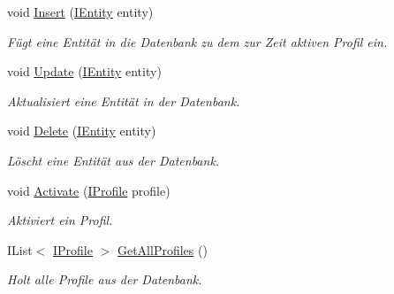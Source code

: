 \begin{CompactItemize}
\item 
void \hyperlink{interfacemy_m_d_1_1_model_1_1_database_model_1_1_i_entity_database_71b401e7c809fdda0a0b15b6792e69c8}{Insert} (\hyperlink{interfacemy_m_d_1_1_model_interface_1_1_data_model_interface_1_1_i_entity}{IEntity} entity)
\begin{CompactList}\small\item\em F\"{u}gt eine Entit\"{a}t in die Datenbank zu dem zur Zeit aktiven Profil ein. \item\end{CompactList}\item 
void \hyperlink{interfacemy_m_d_1_1_model_1_1_database_model_1_1_i_entity_database_bf510dc6cf79d153f564eca0f10971d2}{Update} (\hyperlink{interfacemy_m_d_1_1_model_interface_1_1_data_model_interface_1_1_i_entity}{IEntity} entity)
\begin{CompactList}\small\item\em Aktualisiert eine Entit\"{a}t in der Datenbank. \item\end{CompactList}\item 
void \hyperlink{interfacemy_m_d_1_1_model_1_1_database_model_1_1_i_entity_database_1ec3022b27f9091440cb495f510d25b0}{Delete} (\hyperlink{interfacemy_m_d_1_1_model_interface_1_1_data_model_interface_1_1_i_entity}{IEntity} entity)
\begin{CompactList}\small\item\em L\"{o}scht eine Entit\"{a}t aus der Datenbank. \item\end{CompactList}\item 
void \hyperlink{interfacemy_m_d_1_1_model_1_1_database_model_1_1_i_entity_database_6ffa7bbff9bc4db881433251a158fbd0}{Activate} (\hyperlink{interfacemy_m_d_1_1_model_interface_1_1_data_model_interface_1_1_i_profile}{IProfile} profile)
\begin{CompactList}\small\item\em Aktiviert ein Profil. \item\end{CompactList}\item 
IList$<$ \hyperlink{interfacemy_m_d_1_1_model_interface_1_1_data_model_interface_1_1_i_profile}{IProfile} $>$ \hyperlink{interfacemy_m_d_1_1_model_1_1_database_model_1_1_i_entity_database_cdd42df8b8413bdd0cd36422d4e3f33c}{Get\-All\-Profiles} ()
\begin{CompactList}\small\item\em Holt alle Profile aus der Datenbank. \item\end{CompactList}\item 

\end{CompactItemize}
